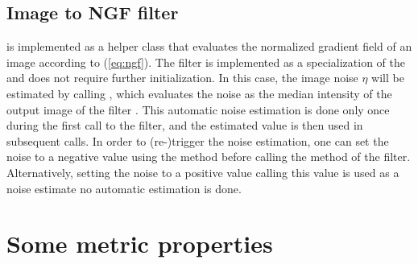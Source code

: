 \documentclass{InsightArticle}
\newcommand{\noise}{\ensuremath{\eta} }
\newcommand{\ImageToNGFFilter}{\code{ImageToNGFFilter} }
\begin{document}
\subsection{Image to NGF filter}

\ImageToNGFFilter is implemented as a helper class that evaluates the normalized gradient field 
  of an image according to (\ref{eq:ngf}). 
The filter is implemented as a specialization of the  and does not require 
  further initialization. 
In this case, the image noise \noise will be estimated by calling , 
  which evaluates the noise as the median intensity of the output image of the filter .
This automatic noise estimation is done only once during the first call to the filter, 
  and the estimated value is then used in subsequent calls.
In order to (re-)trigger the noise estimation, one can set the noise to a negative value
  using the  method before calling the  method of the filter. 
Alternatively, setting the noise to a positive value calling 
  this value is used as a noise estimate no automatic estimation is done.
 

\section{Some metric properties}
\end{document}
